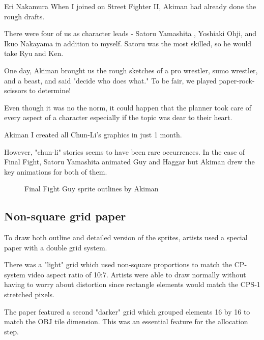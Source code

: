 \begin{q}{Eri Nakamura\cite{sf2devinterview}}
When I joined on Street Fighter II, Akiman had already done the rough drafts. 

There were four of us as character leads - Satoru Yamashita , Yoshiaki Ohji, and Ikuo Nakayama in addition to myself. Satoru was the most skilled, so he would take Ryu and Ken. 

One day, Akiman brought us the rough sketches of a pro wrestler, sumo wrestler, and a beast, and said "decide who does what." To be fair, we played paper-rock-scissors to determine!
\end{q}



Even though it was no the norm, it could happen that the planner took care of every aspect of a character especially if the topic was dear to their heart.

\begin{q}{Akiman\cite{gameMaestro4}}
I created all Chun-Li’s graphics in just 1 month.
\end{q}

However, "chun-li" stories seems to have been rare occurrences.   In the case of Final Fight, Satoru Yamashita animated Guy and Haggar but Akiman drew the key animations for both of them.



\begin{figure}[H]
\caption*{Final Fight Guy sprite outlines by Akiman}
\end{figure}




\subsection{Non-square grid paper}
To draw both outline and detailed version of the sprites, artists used a special paper with a double grid system.

There was a "light" grid which used non-square proportions to match the CP-system video aspect ratio of 10:7. Artists were able to draw normally without having to worry about distortion since rectangle elements would match the CPS-1 stretched pixels. 

The paper featured a second "darker" grid which grouped elements 16 by 16 to match the OBJ tile dimension. This was an essential feature for the allocation step.





